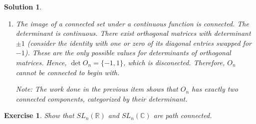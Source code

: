\documentclass{article}
\newtheorem{ex}{Exercise}
\theoremstyle{nonumberplain}
\newtheorem{sol}{Solution}
\newcommand{\R}{\mathbb{R}}
\newcommand{\C}{\mathbb{C}}
\DeclarePairedDelimiter{\abs}{\lvert}{\rvert}
\begin{document}
\begin{sol}
\begin{enumerate}
Now we look at the case we find ourselves in. If we are in $SO_n$ or $SU_n$, the determinant of $M$ is one and hence $m_{nn} = 1$, so we are at the identity, as desired. On the other hand, if we are in $U_n$ we only know that $\abs{m_{nn}} = 1$, but since we are not beholden to keeping the determinant constant, we may continuously vary $m_{nn}$ to 1 in the unit circle. This completes the construction, and hence the proof that $U_n$, $SU_n$ and $SO_n$ are path connected.

\item The image of a connected set under a continuous function is connected. The determinant is continuous. There exist orthogonal matrices with determinant $\pm 1$ (consider the identity with one or zero of its diagonal entries swapped for $-1$). These are the only possible values for determinants of orthogonal matrices. Hence, $\det O_n = \{-1,1\}$, which is disconected. Therefore, $O_n$ cannot be connected to begin with.

Note: The work done in the previous item shows that $O_n$ has exactly two connected components, categorized by their determinant.
\end{enumerate}
\end{sol}

\begin{ex}
Show that $SL_n(\R)$ and $SL_n(\C)$ are path connected.
\end{ex}
\end{document}
